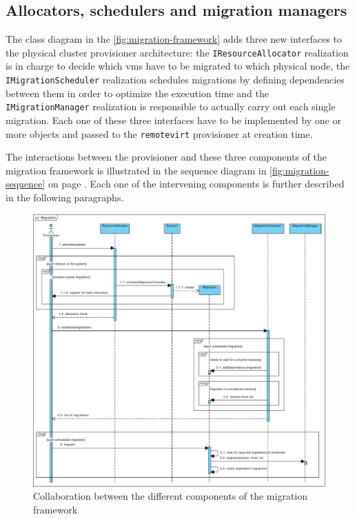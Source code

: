 \subsection{Allocators, schedulers and migration managers}

The class diagram in the \autoref{fig:migration-framework} adds three new interfaces to the physical cluster provisioner architecture: the \texttt{IResourceAllocator} realization is in charge to decide which \glspl{vm} have to be migrated to which physical node, the \texttt{IMigrationScheduler} realization schedules migrations by defining dependencies between them in order to optimize the execution time and the \texttt{IMigrationManager} realization is responsible to actually carry out each single migration. Each one of these three interfaces have to be implemented by one or more objects and passed to the \texttt{remotevirt} provisioner at creation time.

The interactions between the provisioner and these three components of the migration framework is illustrated in the sequence diagram in \autoref{fig:migration-sequence} on page \pageref{fig:migration-sequence}. Each one of the intervening components is further described in the following paragraphs.

\begin{figure}[h]
	\centering
	\includegraphics[width=1\textwidth]{figures/migration-sequence}
	\caption{Collaboration between the different components of the migration framework}
	\label{fig:migration-sequence}
\end{figure}

